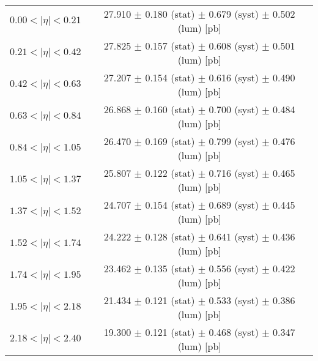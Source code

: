 \begin{tabular}{lc}
\hline
$0.00 < |\eta| <0.21$          & 27.910 $\pm$ 0.180 (stat) $\pm$ 0.679 (syst) $\pm$ 0.502 (lum) [pb]  \\
$0.21 < |\eta| <0.42$          & 27.825 $\pm$ 0.157 (stat) $\pm$ 0.608 (syst) $\pm$ 0.501 (lum) [pb]  \\
$0.42 < |\eta| <0.63$          & 27.207 $\pm$ 0.154 (stat) $\pm$ 0.616 (syst) $\pm$ 0.490 (lum) [pb]  \\
$0.63 < |\eta| <0.84$          & 26.868 $\pm$ 0.160 (stat) $\pm$ 0.700 (syst) $\pm$ 0.484 (lum) [pb]  \\
$0.84 < |\eta| <1.05$          & 26.470 $\pm$ 0.169 (stat) $\pm$ 0.799 (syst) $\pm$ 0.476 (lum) [pb]  \\
$1.05 < |\eta| <1.37$          & 25.807 $\pm$ 0.122 (stat) $\pm$ 0.716 (syst) $\pm$ 0.465 (lum) [pb]  \\
$1.37 < |\eta| <1.52$          & 24.707 $\pm$ 0.154 (stat) $\pm$ 0.689 (syst) $\pm$ 0.445 (lum) [pb]  \\
$1.52 < |\eta| <1.74$          & 24.222 $\pm$ 0.128 (stat) $\pm$ 0.641 (syst) $\pm$ 0.436 (lum) [pb]  \\
$1.74 < |\eta| <1.95$          & 23.462 $\pm$ 0.135 (stat) $\pm$ 0.556 (syst) $\pm$ 0.422 (lum) [pb]  \\
$1.95 < |\eta| <2.18$          & 21.434 $\pm$ 0.121 (stat) $\pm$ 0.533 (syst) $\pm$ 0.386 (lum) [pb]  \\
$2.18 < |\eta| <2.40$          & 19.300 $\pm$ 0.121 (stat) $\pm$ 0.468 (syst) $\pm$ 0.347 (lum) [pb]  \\
\hline
\end{tabular}
